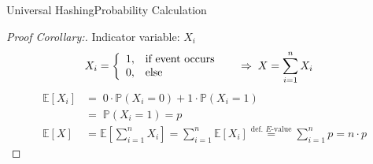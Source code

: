 \begin{frame}{Universal Hashing}{Probability Calculation}
  \begin{proof}[Proof Corollary:]
    Indicator variable: $X_i$\\
    \vspace*{-1.5em}
    \begin{align*}
      X_i &=
        \left\lbrace
          \begin{array}{ll}
            1, & \text{if event occurs}\\
            0, & \text{else}
          \end{array}
        \right. \hspace{1.5em}
        \Rightarrow \; X = \sum_{i=1}^{n} X_i
    \end{align*}
    \vspace*{-1.0em}
    \begin{align*}
      \mathbb{E}[X_i]
        &= \; 0 \cdot \mathbb{P}(X_i = 0) + 1 \cdot \mathbb{P}(X_i = 1)\\
      {} &= \; \mathbb{P}(X_i = 1) = p\\[0.5em]
      \mathbb{E}[X] &= \mathbb{E}\left[\sum_{i=1}^{n} X_i\right]
        = \sum_{i=1}^{n} \mathbb{E}[X_i]
        \stackrel{\text{def. $E$-value}}{=}
        \sum_{i=1}^{n} p = n \cdot p
    \end{align*}
    \qedhere
  \end{proof}
\end{frame}